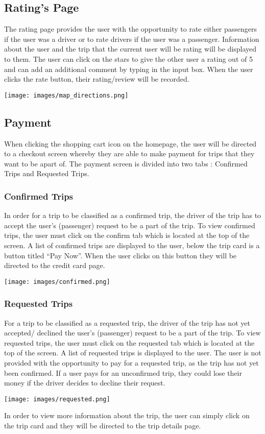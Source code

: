 \documentclass[hidelinks, 12pt, a4paper]{article}
\begin{document}
\subsection{Rating's Page}
The rating page provides the user with the opportunity to rate either passengers if the user was a driver or to rate drivers if the user was a passenger. Information about the user and the trip that the current user will be rating will be displayed to them. The user can click on the stars to give the other user a rating out of 5 and can add an additional comment by typing in the input box. When the user clicks the rate button, their rating/review will be recorded.
\begin{center}
  \texttt{[image: images/map\_directions.png]}
\end{center}


\subsection{Payment}
When clicking the shopping cart icon on the homepage, the user will be directed to a checkout screen whereby they are able to make payment for trips that they want to be apart of. The payment screen is divided into two tabs : Confirmed Trips and Requested Trips.

\subsubsection{Confirmed Trips}
In order for a trip to be classified as a confirmed trip, the driver of the trip has to accept the user’s (passenger) request to be a part of the trip. To view confirmed trips, the user must click on the confirm tab which is located at the top of the screen. A list of confirmed trips are displayed to the user, below the trip card is a button titled “Pay Now”. When the user clicks on this button they will be directed to the credit card page.
\begin{center}
  \texttt{[image: images/confirmed.png]}
\end{center}
\vspace{1cm}

\subsubsection{Requested Trips}
For a trip to be classified as a requested trip, the driver of the trip has not yet accepted/ declined the user’s (passenger) request to be a part of the trip. To view requested trips, the user must click on the requested tab which is located at the top of the screen. A list of requested trips is displayed to the user. The user is not provided with the opportunity to pay for a requested trip, as the trip has not yet been confirmed. If a user pays for an unconfirmed trip, they could lose their money if the driver decides to decline their request.
\begin{center}
  \texttt{[image: images/requested.png]}
\end{center}
\vspace{1cm}
In order to view more information about the trip, the user can simply click on the trip card and they will be directed to the trip details page.
\end{document}
